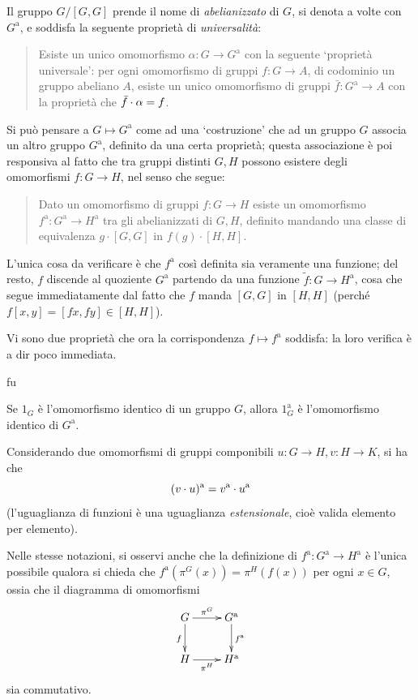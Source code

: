 Il gruppo \(G/[G,G]\) prende il nome di \emph{abelianizzato} di \(G\), si denota a volte con \(G^\text{a}\), e soddisfa la seguente proprietà di \emph{universalità}:
\begin{quote}
 Esiste un unico omomorfismo \(\alpha \colon G \to G^\text{a}\) con la seguente `proprietà universale': per ogni omomorfismo di gruppi \(f \colon G \to A\), di codominio un gruppo abeliano \(A\), esiste un unico omomorfismo di gruppi \(\bar f \colon G^\text{a} \to A\) con la proprietà che \(\bar f \cdot \alpha = f\).
\end{quote}
\begin{remark}
 Si può pensare a \(G\mapsto G^\text{a}\) come ad una `costruzione' che ad un gruppo \(G\) associa un altro gruppo \(G^\text{a}\), definito da una certa proprietà; questa associazione è poi responsiva al fatto che tra gruppi distinti \(G,H\) possono esistere degli omomorfismi \(f \colon G \to H\), nel senso che segue:
 \begin{quote}
  Dato un omomorfismo di gruppi \(f \colon G \to H\) esiste un omomorfismo \(f^\text{a} \colon G^\text{a} \to H^\text{a}\) tra gli abelianizzati di \(G,H\), definito mandando una classe di equivalenza \(g\cdot [G,G]\) in \(f(g)\cdot [H,H]\).
 \end{quote}
 L'unica cosa da verificare è che \(f^\text{a}\) così definita sia veramente una funzione; del resto, \(f\) discende al quoziente \(G^\text{a}\) partendo da una funzione \(\tilde f \colon G\to H^\text{a}\), cosa che segue immediatamente dal fatto che \(f\) manda \([G,G]\) in \([H,H]\) (perché \(f[x,y]=[fx, fy]\in [H,H]\)).
\end{remark}
Vi sono due proprietà che ora la corrispondenza \(f\mapsto f^\text{a}\) soddisfa: la loro verifica è a dir poco immediata.
\begin{enumtag}{fu}
 \item \label{fct_1} Se \(1_G\) è l'omomorfismo identico di un gruppo \(G\), allora \(1_G^\text{a}\) è l'omomorfismo identico di \(G^\text{a}\).
 \item \label{fct_2} Considerando due omomorfismi di gruppi componibili \(u \colon G\to H, v \colon H\to K\), si ha che
 \[(v\cdot u)^\text{a} = v^\text{a} \cdot u^\text{a}\]
 (l'uguaglianza di funzioni è una uguaglianza \emph{estensionale}, cioè valida elemento per elemento).
\end{enumtag}
Nelle stesse notazioni, si osservi anche che la definizione di \(f^\text{a} \colon G^\text{a} \to H^\text{a}\) è l'unica possibile qualora si chieda che \(f^\text{a}(\pi^G(x)) = \pi^H(f(x))\) per ogni \(x\in G\), ossia che il diagramma di omomorfismi
\[\xymatrix{
 G \ar[r]^-{\pi^G} \ar[d]_f & G^\text{a}\ar[d]^{f^\text{a}} \\
 H \ar[r]_-{\pi^H} & H^\text{a}
 }\]
sia commutativo.

